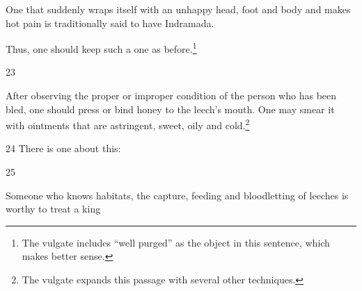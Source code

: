 \begin{translation}
One that suddenly wraps itself with an unhappy head, foot and body and makes hot 
pain is traditionally said to have Indramada.

Thus, one should keep such a one as before.\footnote{The vulgate includes
    “well purged” as the object in this sentence, which makes better sense.}

\item[23]

After observing the proper or improper condition of the person who has been
bled, one should press or bind honey to the leech's mouth. One may smear it
with ointments that are astringent, sweet, oily and cold.\footnote{The vulgate 
    expands this passage with several other techniques.}

\item[24]
There is one about this:
\begin{sloka}
    \dag {}\dag
\end{sloka}

\item[25]

\begin{sloka}
    Someone who knows habitats, the capture, feeding and bloodletting of leeches is 
    worthy to treat a king
\end{sloka}

\end{translation}



